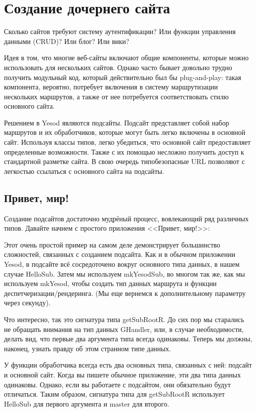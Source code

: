 \chapter{Создание дочернего сайта}\label{chap:subsite}

Сколько сайтов требуют систему аутентификации? Или функции управления данными (CRUD)? Или блог? Или вики?

Идея в том, что многие веб-сайты включают общие компоненты, которые можно использовать для нескольких сайтов. Однако часто бывает довольно трудно получить модульный код, который действительно был бы plug-and-play: такая компонента, вероятно, потребует включения в систему маршрутизации нескольких маршрутов, а также от нее потребуется соответствовать стилю основного сайта.

Решением в Yesod являются подсайты. Подсайт представляет собой набор маршрутов и их обработчиков, которые могут быть легко включены в основной сайт. Используя классы типов, легко убедиться, что основной сайт предоставляет определенные возможности. Также с их помощью несложно получить доступ к стандартной разметке сайта. В свою очередь типобезопасные URL позволяют с легкостью ссылаться с основного сайта на подсайты.

\section{Привет, мир!}

Создание подсайтов достаточно мудрёный процесс, вовлекающий ряд различных типов. Давайте начнем с простого приложения <<Привет, мир!>>:

Этот очень простой пример на самом деле демонстрирует большинство сложностей, связанных с созданием подсайта. Как и в обычном приложении Yesod, в подсайте всё сосредоточено вокруг основного типа данных, в нашем случае HelloSub. Затем мы используем mkYesodSub, во многом так же, как мы используем mkYesod, чтобы создать тип данных маршрута и функции деспетчеризации/рендеринга. (Мы еще вернемся к дополнительному параметру через секунду).

Что интересно, так это сигнатура типа getSubRootR. До сих пор мы старались не обращать внимания на тип данных GHandler, или, в случае необходимости, делать вид, что первые два аргумента типа всегда одинаковы. Теперь мы должны, наконец, узнать правду об этом странном типе данных.

У функции обработчика всегда есть два основных типа, связанных с ней: подсайт и основной сайт. Когда вы пишете обычное приложение, эти два типа данных одинаковы.  Однако, если вы работаете с подсайтом, они обязательно будут отличаться. Таким образом, сигнатура типа для getSubRootR использует HelloSub для первого аргумента и master для второго.

